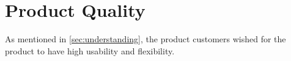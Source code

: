 \section{Product Quality}
As mentioned in \autoref{sec:understanding}, the product customers wished for the product to have high usability and flexibility. 
